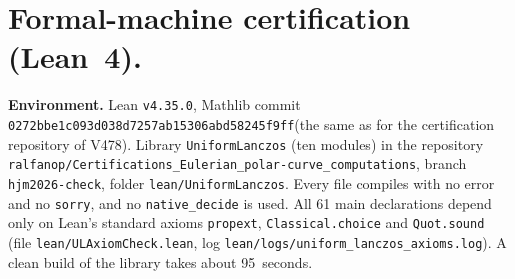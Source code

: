 \documentclass[11pt,a4paper]{article}
\theoremstyle{remark}
\numberwithin{equation}{section}
\begin{document}
\section{Formal-machine certification (Lean~4).}\label{sec:lean}
\sloppy

\textbf{Environment.} Lean \texttt{v4.35.0}, Mathlib commit
{\small\texttt{0272bbe1c093d038d7257ab15306abd58245f9ff}}\linebreak (the same as for the certification
repository of V478). Library \texttt{UniformLanczos} (ten modules) in the repository
\texttt{ralfanop/Certifications\_Eulerian\_polar-curve\_computations}, branch
\texttt{hjm2026-check}, folder \texttt{lean/UniformLanczos}. Every file compiles with no
error and no \texttt{sorry}, and no \texttt{native\_decide} is used. All 61 main
declarations depend only on Lean's standard axioms \texttt{propext},
\texttt{Classical.choice} and \texttt{Quot.sound} (file \texttt{lean/ULAxiomCheck.lean},
log \texttt{lean/logs/uniform\_lanczos\_axioms.log}). A clean build of the library takes
about 95~seconds.
\end{document}
